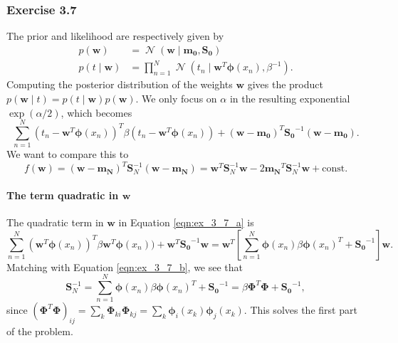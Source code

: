 \documentclass[12pt, a4paper]{article}
\newcommand{\vect}[1]{\bm{#1}}
\DeclareMathOperator{\N}{\mathcal{N}}
\begin{document}
\subsubsection*{Exercise 3.7}
The prior and likelihood are respectively given by
\begin{align*}
	p(\vect{w} ) &= \N (\vect{w} \mid \vect{m_0}, \vect{S_0}) \\
	p(t \mid \vect{w}) &= \prod_{n=1}^{N} \N (t_n \mid \vect{w}^T \vect{\phi} (x_n), \beta^{-1}).
\end{align*}
Computing the posterior distribution of the weights $\vect{w}$ gives the product $p(\vect{w} \mid t) = p(t \mid \vect{w}) p(\vect{w} )$.
We only focus on $\alpha$ in the resulting exponential $\exp(\alpha/2)$, which becomes
\begin{equation}
\label{eqn:ex_3_7_a}
	\sum_{n=1}^{N} (t_n - \vect{w}^T \vect{\phi}(x_n))^T \beta (t_n - \vect{w}^T \vect{\phi}(x_n))
	+
	(\vect{w} - \vect{m_0})^T \vect{S_0}^{-1} (\vect{w} - \vect{m_0}).
\end{equation}
We want to compare this to 
\begin{equation}
\label{eqn:ex_3_7_b}
	f(\vect{w}) = (\vect{w} - \vect{m_N})^T \vect{S}_N^{-1} (\vect{w} - \vect{m_N}) = \vect{w}^T \vect{S}_N^{-1} \vect{w} - 2 \vect{m_N}^T \vect{S}_N^{-1} \vect{w} + \text{const}.
\end{equation}
\paragraph{The term quadratic in $\vect{w}$}
The quadratic term in $\vect{w}$ in Equation \eqref{eqn:ex_3_7_a} is
\begin{equation*}
	\sum_{n=1}^{N} (\vect{w}^T \vect{\phi}(x_n))^T \beta \vect{w}^T \vect{\phi}(x_n))
	+
	\vect{w}^T \vect{S_0}^{-1} \vect{w}
	=
	\vect{w}^T
	\left[ \sum_{n=1}^{N}  \vect{\phi}(x_n) \beta \vect{\phi}(x_n)^T + \vect{S_0}^{-1} \right]
	\vect{w}.
\end{equation*}
Matching with Equation \eqref{eqn:ex_3_7_b}, we see that
\begin{equation*}
	\vect{S}_N^{-1} = \sum_{n=1}^{N}  \vect{\phi}(x_n) \beta \vect{\phi}(x_n)^T + \vect{S_0}^{-1}
	= \beta \vect{\Phi}^T \vect{\Phi}  + \vect{S_0}^{-1},
\end{equation*}
since $\left( \vect{\Phi}^T \vect{\Phi} \right)_{ij} = \sum_k \vect{\Phi}_{ki} \vect{\Phi}_{kj} = \sum_k \vect{\phi}_i (x_k) \vect{\phi}_j (x_k)$.
This solves the first part of the problem.
\end{document}
